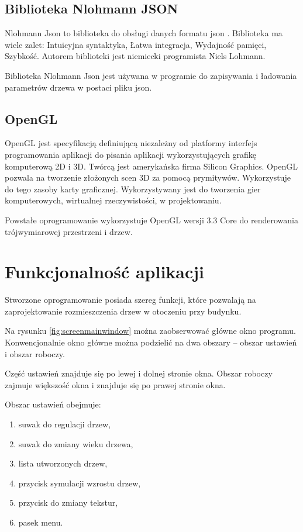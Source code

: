 \documentclass[a4paper,twoside,12pt]{report}
\begin{document}
\subsection{Biblioteka Nlohmann JSON}

Nlohmann Json to biblioteka do obsługi danych formatu json \cite{nlohmannjson}.
Biblioteka ma wiele zalet: Intuicyjna syntaktyka, Łatwa integracja,
Wydajność pamięci, Szybkość. Autorem biblioteki jest 
niemiecki programista Niels Lohmann.

Biblioteka Nlohmann Json jest używana w programie do zapisywania i 
ładowania parametrów drzewa w postaci pliku json.

\subsection{OpenGL}

OpenGL jest specyfikacją definiującą niezależny od
platformy interfejs programowania aplikacji do pisania 
aplikacji wykorzystujących grafikę komputerową 2D i 3D. 
Twórcą jest amerykańska firma Silicon Graphics. OpenGL pozwala na tworzenie 
złożonych scen 3D za pomocą prymitywów. Wykorzystuje do tego zasoby 
karty graficznej. Wykorzystywany jest do 
tworzenia gier komputerowych, wirtualnej rzeczywistości, w projektowaniu.

Powstałe oprogramowanie wykorzystuje OpenGL wersji 3.3 Core do renderowania trójwymiarowej 
przestrzeni i drzew.

\section{Funkcjonalność aplikacji}

Stworzone oprogramowanie posiada szereg funkcji, które pozwalają na 
zaprojektowanie rozmieszczenia drzew w otoczeniu przy budynku. 

Na rysunku \ref{fig:screenmainwindow} można zaobserwować główne okno programu. 
Konwencjonalnie okno główne można podzielić na dwa obszary -- 
obszar ustawień i obszar roboczy.

Część ustawień znajduje się po lewej i dolnej stronie okna. 
Obszar roboczy zajmuje większość okna i znajduje się po prawej stronie okna.

Obszar ustawień obejmuje:
\begin{enumerate}
	\item suwak do regulacji drzew,
	\item suwak do zmiany wieku drzewa,
	\item lista utworzonych drzew,
	\item przycisk symulacji wzrostu drzew,
	\item przycisk do zmiany tekstur,
	\item pasek menu.
\end{enumerate}
\end{document}
